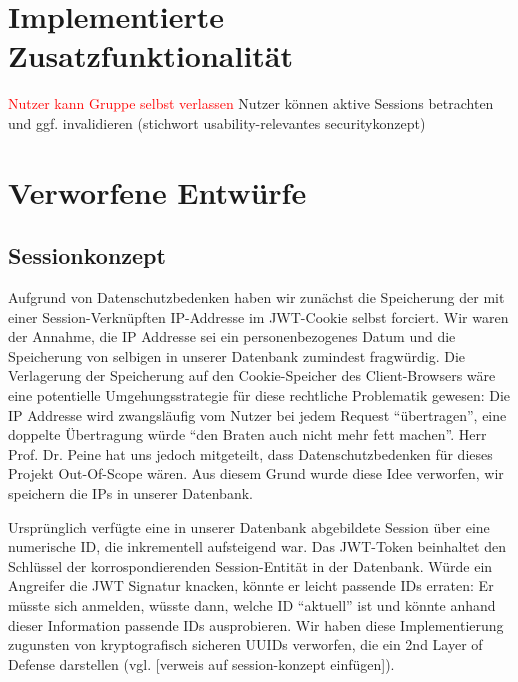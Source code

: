 \documentclass[12pt,DIV14,BCOR10mm,a4paper,parskip=half-,headsepline,headinclude,english,ngerman,bibliography=totocnumbered]{scrreprt}
\begin{document}
\chapter{Implementierte Zusatzfunktionalität}

\textcolor{red}{Nutzer kann Gruppe selbst verlassen}
Nutzer können aktive Sessions betrachten und ggf. invalidieren (stichwort usability-relevantes securitykonzept)

\chapter{Verworfene Entwürfe}

\section{Sessionkonzept}
Aufgrund von Datenschutzbedenken haben wir zunächst die Speicherung der mit einer Session-Verknüpften IP-Addresse im JWT-Cookie selbst forciert. Wir waren der Annahme, die IP Addresse sei ein personenbezogenes Datum und die Speicherung von selbigen in unserer Datenbank zumindest fragwürdig. Die Verlagerung der Speicherung auf den Cookie-Speicher des Client-Browsers wäre eine potentielle Umgehungsstrategie für diese rechtliche Problematik gewesen: Die IP Addresse wird zwangsläufig vom Nutzer bei jedem Request ``übertragen'', eine doppelte Übertragung würde ``den Braten auch nicht mehr fett machen''. Herr Prof. Dr. Peine hat uns jedoch mitgeteilt, dass Datenschutzbedenken für dieses Projekt Out-Of-Scope wären. Aus diesem Grund wurde diese Idee verworfen, wir speichern die IPs in unserer Datenbank.

Ursprünglich verfügte eine in unserer Datenbank abgebildete Session über eine numerische ID, die inkrementell aufsteigend war. Das JWT-Token beinhaltet den Schlüssel der korrospondierenden Session-Entität in der Datenbank. Würde ein Angreifer die JWT Signatur knacken, könnte er leicht passende IDs erraten: Er müsste sich anmelden, wüsste dann, welche ID ``aktuell'' ist und könnte anhand dieser Information passende IDs ausprobieren. Wir haben diese Implementierung zugunsten von kryptografisch sicheren UUIDs verworfen, die ein 2nd Layer of Defense darstellen (vgl. [verweis auf session-konzept einfügen]).

\printbibliography

\printacronyms[title=Abkürzungsverzeichnis,toctitle=Abkürzungsverzeichnis]
\printglossary[type=main]

\listoffigures      %

\end{document}
